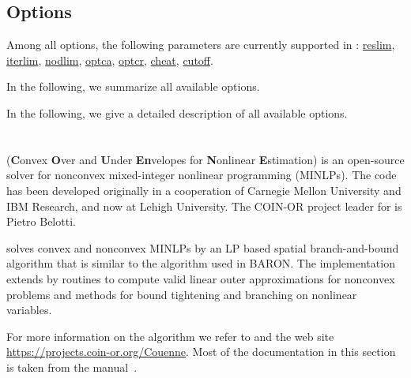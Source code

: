 
\subsection{Options}

Among all \CBC options, the following \MYGAMS parameters are currently supported in \CBC:
\hyperlink{reslim}{reslim}, \hyperlink{iterlim}{iterlim}, \hyperlink{nodlim}{nodlim}, \hyperlink{optca}{optca}, \hyperlink{optcr}{optcr}, \hyperlink{increment}{cheat}, \hyperlink{cutoff}{cutoff}.

In the following, we summarize all available \CBC options.

In the following, we give a detailed description of all available \CBC options.

\section{\COUENNE}


\COUENNE (\textbf{C}onvex \textbf{O}ver and \textbf{U}nder \textbf{En}velopes for \textbf{N}onlinear \textbf{E}stimation) is an open-source solver for nonconvex mixed-integer nonlinear programming (MINLPs).
The code has been developed originally in a cooperation of Carnegie Mellon University and IBM Research, and now at Lehigh University.
The COIN-OR project leader for \COUENNE is Pietro Belotti.

\COUENNE solves convex and nonconvex MINLPs by an LP based spatial branch-and-bound algorithm that is similar to the algorithm used in \textsc{BARON}.
The implementation extends \BONMIN by routines to compute valid linear outer approximations for nonconvex problems and methods for bound tightening and branching on nonlinear variables.

For more information on the algorithm we refer to \cite{Be09,BeLeLiMaWa08} and the \COUENNE web site \url{https://projects.coin-or.org/Couenne}.
Most of the \COUENNE documentation in this section is taken from the \COUENNE manual~\cite{CouenneManual}.

